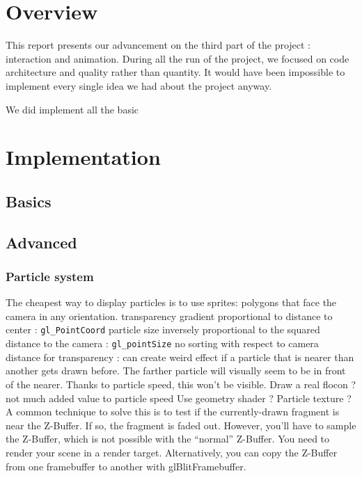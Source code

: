\documentclass[a4paper,11pt]{article}
\begin{document}
\section{Overview}

This report presents our advancement on the third part of the project : interaction and animation. During all the run of the project, we focused on code architecture and quality rather than quantity. It would have been impossible to implement every single idea we had about the project anyway.

We did implement all the basic

\section{Implementation}

\subsection{Basics}

\subsection{Advanced}

\subsubsection{Particle system}

The cheapest way to display particles is to use sprites: polygons that face the camera
in any orientation.
transparency gradient proportional to distance to center : \texttt{gl\_PointCoord}
particle size inversely proportional to the squared distance to the camera : \texttt{gl\_pointSize}
no sorting with respect to camera distance for transparency : can create weird effect if a particle that is nearer than another gets drawn before. The farther particle will visually seem to be in front of the nearer. Thanks to particle speed, this won't be visible.
Draw a real flocon ? not much added value to particle speed
Use geometry shader ?
Particle texture ?
A common technique to solve this is to test if the currently-drawn fragment is near the Z-Buffer. If so, the fragment is faded out. However, you’ll have to sample the Z-Buffer, which is not possible with the “normal” Z-Buffer. You need to render your scene in a render target. Alternatively, you can copy the Z-Buffer from one framebuffer to another with glBlitFramebuffer.
\end{document}
